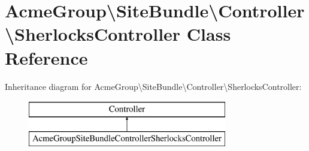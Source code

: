 \hypertarget{class_acme_group_1_1_site_bundle_1_1_controller_1_1_sherlocks_controller}{\section{Acme\+Group\textbackslash{}Site\+Bundle\textbackslash{}Controller\textbackslash{}Sherlocks\+Controller Class Reference}
\label{class_acme_group_1_1_site_bundle_1_1_controller_1_1_sherlocks_controller}
}
Inheritance diagram for Acme\+Group\textbackslash{}Site\+Bundle\textbackslash{}Controller\textbackslash{}Sherlocks\+Controller\+:\begin{figure}[H]
\begin{center}
\leavevmode
\includegraphics[height=2.000000cm]{class_acme_group_1_1_site_bundle_1_1_controller_1_1_sherlocks_controller}
\end{center}
\end{figure}
